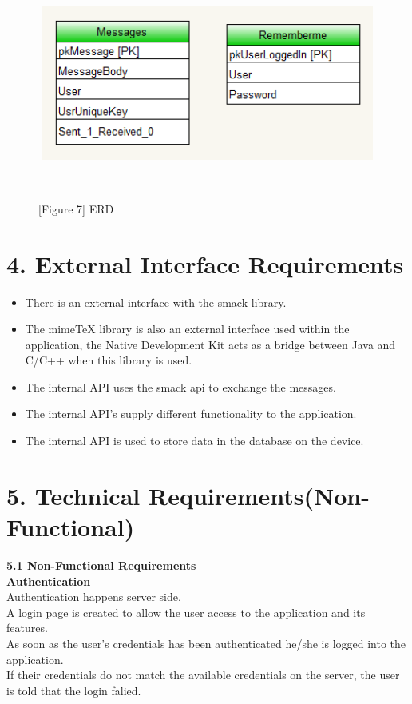 \documentclass[29pt,a4paper]{moderncv}
\begin{document}
	\begin{figure}
		\centering
		\\ \includegraphics[width=4.5in, height=2.0in]{./erd.png}
		\\\caption{[Figure 7] ERD}\\
	\end{figure}
	
\newpage	
	\section*{\textbf{4. External Interface Requirements}}
	\vspace{4mm}
		\begin{itemize}
			\item There is an external interface with the smack library.
			\item The mimeTeX library is also an external interface used within the application, the Native Development Kit acts as a bridge between Java and C/C++ when this library is used.
			\item The internal API uses the smack api to exchange the messages.
			\item The internal API's supply different functionality to the application.
			\item The internal API is used to store data in the database on the device.
		\end{itemize}

\newpage	
		\section*{\textbf{5. Technical Requirements(Non-Functional)}}
		\vspace{4mm}
		\noindent \textbf{5.1 Non-Functional Requirements}\\
		
		\noindent \textbf{Authentication}\\
			Authentication happens server side. \\
			A login page is created to allow the user access to the application and its features. \\
			As soon as the user’s credentials has been authenticated he/she is logged into the application.\\
			If their credentials do not match the available credentials on the server, the user is told that the login falied.\\
			
\end{document}

